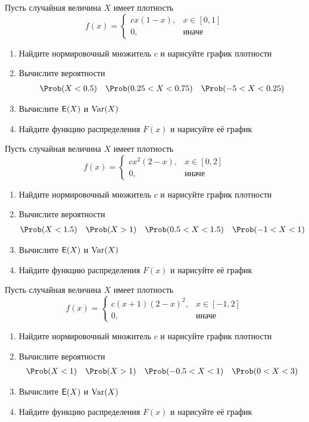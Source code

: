 \begin{exercise}
Пусть случайная величина \(X\) имеет плотность
\[
	f(x)=\begin{cases}
	cx(1-x), & x\in[0,1] \\ 0, & \text{иначе}
	\end{cases}
\]
\begin{enumerate}
	\item Найдите нормировочный множитель \(c\) и нарисуйте график плотности
	\item Вычислите вероятности
	\begin{align*}
		\Prob&(X<0.5) & \Prob&(0.25<X<0.75) & \Prob(-5<X<0.25)
	\end{align*}
	\item Вычислите \({\mathsf E}(X)\) и \(\operatorname{Var}(X)\)
	\item Найдите функцию распределения \(F(x)\) и нарисуйте её график
\end{enumerate}
\end{exercise}

\begin{exercise}
Пусть случайная величина \(X\) имеет плотность
\[
	f(x)=\begin{cases}
	cx^2(2-x), & x\in[0,2] \\ 0, & \text{иначе}
	\end{cases}
\]
\begin{enumerate}
	\item Найдите нормировочный множитель \(c\) и нарисуйте график плотности
	\item Вычислите вероятности
	\begin{align*}
		\Prob&(X<1.5) & \Prob&(X>1) & \Prob&(0.5<X<1.5) & \Prob(-1<X<1)
	\end{align*}
	\item Вычислите \({\mathsf E}(X)\) и \(\operatorname{Var}(X)\)
	\item Найдите функцию распределения \(F(x)\) и нарисуйте её график
\end{enumerate}
\end{exercise}

\begin{exercise}
Пусть случайная величина \(X\) имеет плотность
\[
	f(x)=\begin{cases}
	c(x+1)(2-x)^2, & x\in[-1,2] \\ 0, & \text{иначе}
	\end{cases}
\]
\begin{enumerate}
	\item Найдите нормировочный множитель \(c\) и нарисуйте график плотности
	\item Вычислите вероятности
	\begin{align*}
		\Prob&(X<1) & \Prob&(X>1) & \Prob&(-0.5<X<1) & \Prob(0<X<3)
	\end{align*}
	\item Вычислите \({\mathsf E}(X)\) и \(\operatorname{Var}(X)\)
	\item Найдите функцию распределения \(F(x)\) и нарисуйте её график
\end{enumerate}
\end{exercise}

